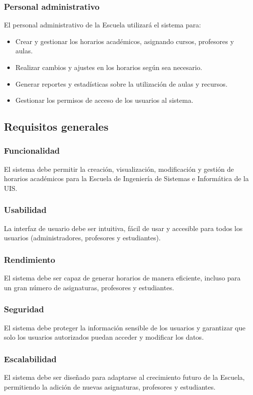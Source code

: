 \documentclass[12pt]{article} %
\begin{document}
    \subsubsection{Personal administrativo}
    \noindent
    El personal administrativo de la Escuela utilizará el sistema para:
    \begin{itemize}
        \item Crear y gestionar los horarios académicos, asignando cursos, profesores y aulas.
        \item Realizar cambios y ajustes en los horarios según sea necesario.
        \item Generar reportes y estadísticas sobre la utilización de aulas y recursos.
        \item Gestionar los permisos de acceso de los usuarios al sistema.    
    \end{itemize}

\subsection{Requisitos generales}
    \subsubsection{Funcionalidad}
    \noindent
    El sistema debe permitir la creación, visualización, modificación y gestión de horarios académicos para la Escuela de Ingeniería de Sistemas e Informática de la UIS.
    \subsubsection{Usabilidad}
    \noindent
    La interfaz de usuario debe ser intuitiva, fácil de usar y accesible para todos los usuarios (administradores, profesores y estudiantes).
    \subsubsection{Rendimiento}
    \noindent
    El sistema debe ser capaz de generar horarios de manera eficiente, incluso para un gran número de asignaturas, profesores y estudiantes.
    \subsubsection{Seguridad}
    \noindent
    El sistema debe proteger la información sensible de los usuarios y garantizar que solo los usuarios autorizados puedan acceder y modificar los datos.
    \subsubsection{Escalabilidad}
    \noindent
    El sistema debe ser diseñado para adaptarse al crecimiento futuro de la Escuela, permitiendo la adición de nuevas asignaturas, profesores y estudiantes.
\end{document}
